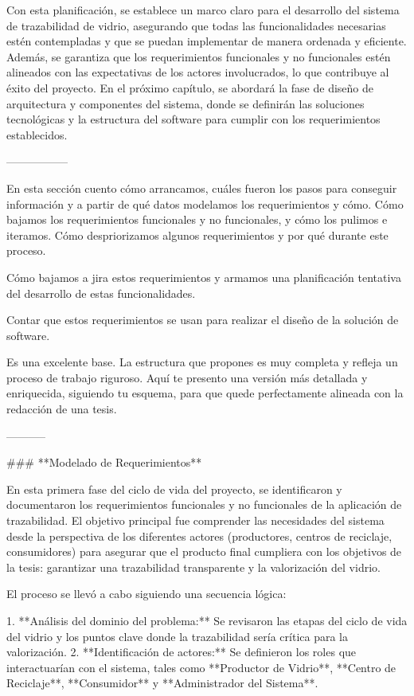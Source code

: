 Con esta planificación, se establece un marco claro para el desarrollo del sistema de trazabilidad de vidrio, asegurando que todas las funcionalidades necesarias estén contempladas y que se puedan implementar de manera ordenada y eficiente. Además, se garantiza que los requerimientos funcionales y no funcionales estén alineados con las expectativas de los actores involucrados, lo que contribuye al éxito del proyecto. En el próximo capítulo, se abordará la fase de diseño de arquitectura y componentes del sistema, donde se definirán las soluciones tecnológicas y la estructura del software para cumplir con los requerimientos establecidos.

-----------------

En esta sección cuento cómo arrancamos, cuáles fueron los pasos para conseguir información y a partir de qué datos modelamos los requerimientos y cómo. Cómo bajamos los requerimientos funcionales y no funcionales, y cómo los pulimos e iteramos. Cómo despriorizamos algunos requerimientos y por qué durante este proceso.

Cómo bajamos a jira estos requerimientos y armamos una planificación tentativa del desarrollo de estas funcionalidades.

Contar que estos requerimientos se usan para realizar el diseño de la solución de software.

Es una excelente base. La estructura que propones es muy completa y refleja un proceso de trabajo riguroso. Aquí te presento una versión más detallada y enriquecida, siguiendo tu esquema, para que quede perfectamente alineada con la redacción de una tesis.

-----------

### **Modelado de Requerimientos**

En esta primera fase del ciclo de vida del proyecto, se identificaron y documentaron los requerimientos funcionales y no funcionales de la aplicación de trazabilidad. El objetivo principal fue comprender las necesidades del sistema desde la perspectiva de los diferentes actores (productores, centros de reciclaje, consumidores) para asegurar que el producto final cumpliera con los objetivos de la tesis: garantizar una trazabilidad transparente y la valorización del vidrio.

El proceso se llevó a cabo siguiendo una secuencia lógica:

1.  **Análisis del dominio del problema:** Se revisaron las etapas del ciclo de vida del vidrio y los puntos clave donde la trazabilidad sería crítica para la valorización.
2.  **Identificación de actores:** Se definieron los roles que interactuarían con el sistema, tales como **Productor de Vidrio**, **Centro de Reciclaje**, **Consumidor** y **Administrador del Sistema**.

